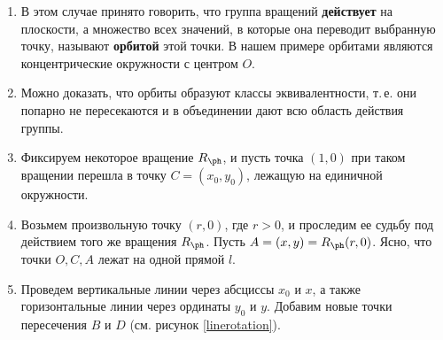 \begin{enumerate}
\item В этом случае принято говорить, что группа вращений \textbf{действует} на плоскости, а множество всех значений, в которые она переводит выбранную точку, называют \textbf{орбитой} этой точки. В нашем примере орбитами являются концентрические окружности с центром $O$.
\item Можно доказать, что орбиты образуют классы эквивалентности, т.\,е. они попарно не пересекаются и в объединении дают всю область действия группы.
\item Фиксируем некоторое вращение $R_\ph$, и пусть точка $(1,0)$ при таком вращении перешла в точку $C=(x_0,y_0)$, лежащую на единичной окружности.
\item Возьмем произвольную точку $(r,0)$, где $r>0$, и проследим ее судьбу под действием того же вращения $R_\ph$. Пусть $A=(x,y)=R_\ph(r,0)$. Ясно, что точки $O,C,A$ лежат на одной прямой $l$.
\item Проведем вертикальные линии через абсциссы $x_0$ и $x$, а также горизонтальные линии через ординаты $y_0$ и $y$. Добавим новые точки пересечения $B$ и $D$ (см. рисунок \ref{linerotation}).


\end{enumerate}
